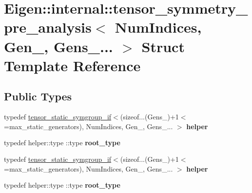\hypertarget{struct_eigen_1_1internal_1_1tensor__symmetry__pre__analysis_3_01_num_indices_00_01_gen___00_01_gens___8_8_8_01_4}{}\section{Eigen\+:\+:internal\+:\+:tensor\+\_\+symmetry\+\_\+pre\+\_\+analysis$<$ Num\+Indices, Gen\+\_\+, Gens\+\_\+... $>$ Struct Template Reference}
\label{struct_eigen_1_1internal_1_1tensor__symmetry__pre__analysis_3_01_num_indices_00_01_gen___00_01_gens___8_8_8_01_4}
\subsection*{Public Types}
\begin{DoxyCompactItemize}
\item 
\mbox{\label{struct_eigen_1_1internal_1_1tensor__symmetry__pre__analysis_3_01_num_indices_00_01_gen___00_01_gens___8_8_8_01_4_a8e91190584531ad87e6e4fff50b3fe43}} 
typedef \hyperlink{struct_eigen_1_1internal_1_1tensor__static__symgroup__if}{tensor\+\_\+static\+\_\+symgroup\+\_\+if}$<$(sizeof...(Gens\+\_\+)+1$<$=max\+\_\+static\+\_\+generators), Num\+Indices, Gen\+\_\+, Gens\+\_\+... $>$ {\bfseries helper}
\item 
\mbox{\label{struct_eigen_1_1internal_1_1tensor__symmetry__pre__analysis_3_01_num_indices_00_01_gen___00_01_gens___8_8_8_01_4_a1136536d7e2305136409429c1a803b85}} 
typedef helper\+::type \+::type {\bfseries root\+\_\+type}
\item 
\mbox{\label{struct_eigen_1_1internal_1_1tensor__symmetry__pre__analysis_3_01_num_indices_00_01_gen___00_01_gens___8_8_8_01_4_a8e91190584531ad87e6e4fff50b3fe43}} 
typedef \hyperlink{struct_eigen_1_1internal_1_1tensor__static__symgroup__if}{tensor\+\_\+static\+\_\+symgroup\+\_\+if}$<$(sizeof...(Gens\+\_\+)+1$<$=max\+\_\+static\+\_\+generators), Num\+Indices, Gen\+\_\+, Gens\+\_\+... $>$ {\bfseries helper}
\item 
\mbox{\label{struct_eigen_1_1internal_1_1tensor__symmetry__pre__analysis_3_01_num_indices_00_01_gen___00_01_gens___8_8_8_01_4_a1136536d7e2305136409429c1a803b85}} 
typedef helper\+::type \+::type {\bfseries root\+\_\+type}
\end{DoxyCompactItemize}
